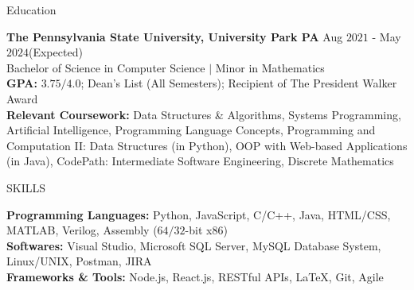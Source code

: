 \documentclass{resume} %
\begin{document}

\begin{rSection}{Education}

{\bf The Pennsylvania State University, University Park PA} \hfill {Aug $2021$ - May $2024$(Expected)}\\
{Bachelor of Science in Computer Science $\vert$ Minor in Mathematics}\\
{\bf GPA:} $3.75/4.0$; Dean's List (All Semesters); Recipient of The President Walker Award\\
{\bf Relevant Coursework:} Data Structures \& Algorithms, Systems Programming, Artificial Intelligence, Programming Language Concepts, Programming and Computation II: Data Structures (in Python), OOP with Web-based Applications (in Java), CodePath: Intermediate Software Engineering, Discrete Mathematics
\end{rSection}


\begin{rSection}{SKILLS}

{\bf Programming Languages:} Python, JavaScript, C/C++, Java, HTML/CSS, MATLAB, Verilog, Assembly ($64/32$-bit x$86$)\\
{\bf Softwares:} Visual Studio, Microsoft SQL Server, MySQL Database System, Linux/UNIX, Postman, JIRA\\
{\bf Frameworks \& Tools:} Node.js, React.js, RESTful APIs, \LaTeX, Git, Agile

\end{rSection}
\end{document}
